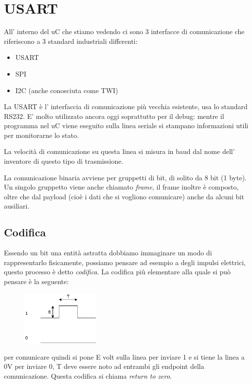 \section{USART}
All' interno del uC che stiamo vedendo ci sono 3 interfacce di comunicazione che riferiscono a 3 standard industriali differenti:
\begin{itemize}
    \item USART
    \item SPI
    \item I2C (anche conosciuta come TWI)
\end{itemize}

La USART è l' interfaccia di comunicazione più vecchia esistente, usa lo standard RS232.
E' molto utilizzato ancora oggi soprattutto per il debug: mentre il programma nel uC viene eseguito sulla linea seriale si stampano informazioni utili per monitorarne lo stato.

La velocità di comunicazione su questa linea si misura in baud dal nome dell' inventore di questo tipo di trasmissione.

La comunicazione binaria avviene per gruppetti di bit, di solito da 8 bit (1 byte).
Un singolo gruppetto viene anche chiamato \emph{frame}, il frame inoltre è composto, oltre che dal payload (cioè i dati che si vogliono comunicare) anche da alcuni bit ausiliari.

\subsection{Codifica}
Essendo un bit una entità astratta dobbiamo immaginare un modo di rappresentarlo fisicamente, possiamo pensare ad esempio a degli impulsi elettrici, questo processo è detto \emph{codifica}.
La codifica più elementare alla quale si può pensare è la seguente:
\begin{figure}[H]
    \centering
    \includegraphics[width=150px]{images/22_USART/simple_bit_encoding.png}
\end{figure}
per comunicare quindi si pone E volt sulla linea per inviare 1 e si tiene la linea a 0V per inviare 0, T deve essere noto ad entrambi gli endpoint della comunicazione.
Questa codifica si chiama \emph{return to zero}.

